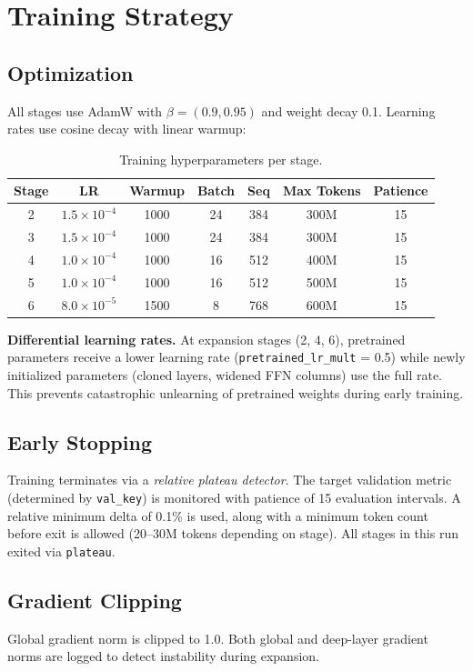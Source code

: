 \section{Training Strategy}

\subsection{Optimization}

All stages use AdamW with $\beta = (0.9, 0.95)$ and weight decay 0.1.
Learning rates use cosine decay with linear warmup:

\begin{table}[H]
\centering\small
\caption{Training hyperparameters per stage.}
\begin{tabular}{ccccccc}
\toprule
\textbf{Stage} & \textbf{LR} & \textbf{Warmup} & \textbf{Batch} &
\textbf{Seq} & \textbf{Max Tokens} & \textbf{Patience} \\
\midrule
2 & $1.5 \times 10^{-4}$ & 1000 & 24 & 384 & 300M & 15 \\
3 & $1.5 \times 10^{-4}$ & 1000 & 24 & 384 & 300M & 15 \\
4 & $1.0 \times 10^{-4}$ & 1000 & 16 & 512 & 400M & 15 \\
5 & $1.0 \times 10^{-4}$ & 1000 & 16 & 512 & 500M & 15 \\
6 & $8.0 \times 10^{-5}$ & 1500 &  8 & 768 & 600M & 15 \\
\bottomrule
\end{tabular}
\end{table}

\textbf{Differential learning rates.}
At expansion stages (2, 4, 6), pretrained parameters receive a lower learning
rate (\texttt{pretrained\_lr\_mult} = 0.5) while newly initialized parameters
(cloned layers, widened FFN columns) use the full rate.  This prevents
catastrophic unlearning of pretrained weights during early training.

\subsection{Early Stopping}

Training terminates via a \emph{relative plateau detector}.  The target
validation metric (determined by \texttt{val\_key}) is monitored with patience
of 15 evaluation intervals.  A relative minimum delta of 0.1\% is used, along
with a minimum token count before exit is allowed (20--30M tokens depending on
stage).  All stages in this run exited via \texttt{plateau}.

\subsection{Gradient Clipping}

Global gradient norm is clipped to 1.0.  Both global and deep-layer gradient
norms are logged to detect instability during expansion.
